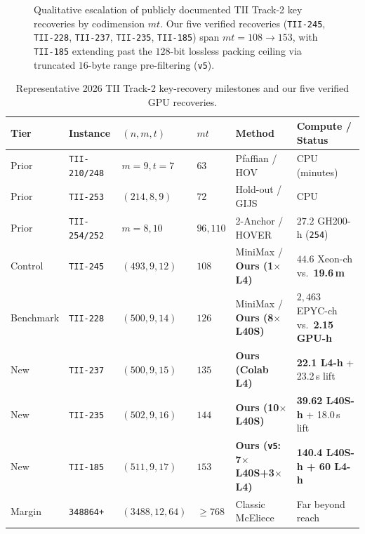 \documentclass[11pt,a4paper]{article}
\begin{document}
\begin{figure}[t]
\caption{Qualitative escalation of publicly documented TII Track-2 key recoveries by codimension $mt$. Our five verified recoveries (\texttt{TII-245}, \texttt{TII-228}, \texttt{TII-237}, \texttt{TII-235}, \texttt{TII-185}) span $mt=108 \to 153$, with \texttt{TII-185} extending past the $128$-bit lossless packing ceiling via truncated $16$-byte range pre-filtering (\texttt{v5}).}
\label{fig:ladder}
\end{figure}

\begin{table}[t]
\centering
\caption{Representative 2026 TII Track-2 key-recovery milestones and our five verified GPU recoveries.}
\label{tab:landscape}
\footnotesize
\setlength{\tabcolsep}{1.9pt}
\begin{tabular}{llllll}
\toprule
Tier & Instance & $(n, m, t)$ & $mt$ & Method & Compute / Status \\
\midrule
Prior & \texttt{TII-210/248} & $m=9, t=7$ & $63$ & Pfaffian / HOV~\cite{BLT26,Hemmert26} & CPU (minutes) \\
Prior & \texttt{TII-253} & $(214, 8, 9)$ & $72$ & Hold-out / GIJS~\cite{Vedenev26,Weis26} & CPU \\
Prior & \texttt{TII-254/252} & $m=8, 10$ & $96, 110$ & 2-Anchor / HOVER~\cite{Saarinen26HOVER,Saarinen26TwoAnchor} & $27.2$ GH200-h (\texttt{254}) \\
Control & \texttt{TII-245} & $(493, 9, 12)$ & $108$ & MiniMax / \textbf{Ours (1$\times$L4)} & $44.6$ Xeon-ch vs.\ \textbf{19.6\,m} \\
Benchmark & \texttt{TII-228} & $(500, 9, 14)$ & $126$ & MiniMax / \textbf{Ours (8$\times$L40S)} & $2{,}463$ EPYC-ch vs.\ \textbf{2.15 GPU-h} \\
New & \texttt{TII-237} & $(500, 9, 15)$ & $135$ & \textbf{Ours (Colab L4)} & \textbf{22.1 L4-h} + 23.2\,s lift \\
New & \texttt{TII-235} & $(502, 9, 16)$ & $144$ & \textbf{Ours (10$\times$L40S)} & \textbf{39.62 L40S-h} + 18.0\,s lift \\
New & \texttt{TII-185} & $(511, 9, 17)$ & $153$ & \textbf{Ours (\texttt{v5}: 7$\times$L40S+3$\times$L4)} & \textbf{140.4 L40S-h + 60 L4-h} \\
Margin & \texttt{348864+} & $(3488, 12, 64)$ & $\ge 768$ & Classic McEliece & Far beyond reach \\
\bottomrule
\end{tabular}
\end{table}
\end{document}
